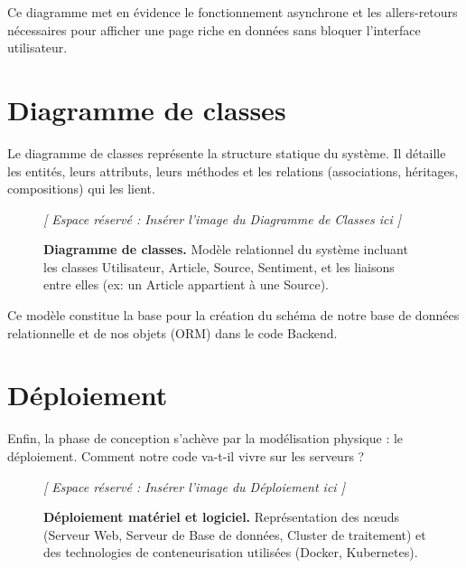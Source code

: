\documentclass[12pt,a4paper,oneside]{report}
\begin{document}
Ce diagramme met en évidence le fonctionnement asynchrone et les allers-retours nécessaires pour afficher une page riche en données sans bloquer l'interface utilisateur.

\section{Diagramme de classes}
Le diagramme de classes représente la structure statique du système. Il détaille les entités, leurs attributs, leurs méthodes et les relations (associations, héritages, compositions) qui les lient.

\begin{figure}[H]
    \centering
    \begin{figbox}
        \vspace{6cm}
        \textcolor{textgray}{\Large \textit{[ Espace réservé : Insérer l'image du Diagramme de Classes ici ]}}
        \vspace{6cm}
    \end{figbox}
    \caption{\textbf{Diagramme de classes.} Modèle relationnel du système incluant les classes Utilisateur, Article, Source, Sentiment, et les liaisons entre elles (ex: un Article appartient à une Source).}
    \label{fig:classes}
\end{figure}

Ce modèle constitue la base pour la création du schéma de notre base de données relationnelle et de nos objets (ORM) dans le code Backend.

\section{Déploiement}
Enfin, la phase de conception s'achève par la modélisation physique : le déploiement. Comment notre code va-t-il vivre sur les serveurs ?

\begin{figure}[H]
    \centering
    \begin{figbox}
        \vspace{6cm}
        \textcolor{textgray}{\Large \textit{[ Espace réservé : Insérer l'image du Déploiement ici ]}}
        \vspace{6cm}
    \end{figbox}
    \caption{\textbf{Déploiement matériel et logiciel.} Représentation des nœuds (Serveur Web, Serveur de Base de données, Cluster de traitement) et des technologies de conteneurisation utilisées (Docker, Kubernetes).}
    \label{fig:deploiement}
\end{figure}
\end{document}
